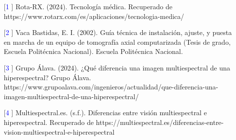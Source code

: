 \documentclass{article}
\begin{document}
\begin{enumerate}
    \item [[\textcolor{blue}{1}]] Rota-RX. (2024). Tecnología médica. Recuperado de https://www.rotarx.com/es/aplicaciones/tecnologia-medica/
    \item [[\textcolor{blue}{2}]] Vaca Bastidas, E. I. (2002). Guía técnica de instalación, ajuste, y puesta en marcha de un equipo de tomografía axial computarizada (Tesis de grado, Escuela Politécnica Nacional). Escuela Politécnica Nacional.
    \item [[\textcolor{blue}{3}]] Grupo Álava. (2024). ¿Qué diferencia una imagen multiespectral de una hiperespectral? Grupo Álava. https://www.grupoalava.com/ingenieros/actualidad/que-diferencia-una-imagen-multiespectral-de-una-hiperespectral/
    \item [[\textcolor{blue}{4}]] Multiespectral.es. (s.f.). Diferencias entre visión multiespectral e hiperespectral. Recuperado de https://multiespectral.es/diferencias-entre-vision-multiespectral-e-hiperespectral
\end{enumerate}
\end{document}
